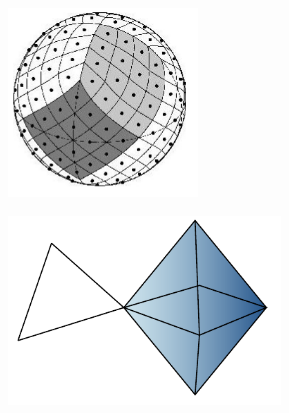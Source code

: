 \documentclass[landscape,a0paper,blockverticalspace = 5mm]{tikzposter}
\begin{document}
\begin{columns}
{{\begin{center}
\begin{minipage}{0.1\linewidth}
\begin{center}
		        
         \end{center}
      \end{minipage} \hspace{0cm}
	\begin{minipage}{0.2\linewidth}
	\begin{center}
          \includegraphics[height=5cm]{figures/sphere.png}
          
        
          \end{center}
      \end{minipage} 
   \begin{minipage}{0.1\linewidth}
      \begin{center}
      
		        
         \end{center}
      \end{minipage} \hspace{0cm}
	\begin{minipage}{0.2\linewidth}
	\begin{center}
          \includegraphics[height=5cm]{figures/high-order.pdf}
          

\end{center}
\end{minipage}
\end{center}}}
\end{columns}
\end{document}
